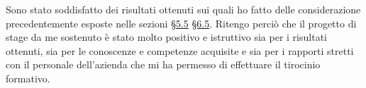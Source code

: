 Sono stato soddisfatto dei risultati ottenuti sui quali ho fatto delle considerazione precedentemente esposte nelle sezioni \hyperref[cap:cons1]{§5.5} \hyperref[cap:cons2]{§6.5}.
Ritengo perciò che il progetto di stage da me sostenuto è stato molto positivo e istruttivo sia per i risultati ottenuti, sia per le conoscenze e competenze acquisite e sia per i rapporti stretti con il personale dell'azienda che mi ha permesso di effettuare il tirocinio formativo.
